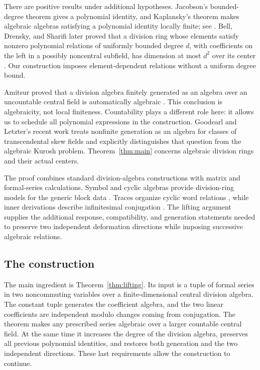 There are positive results under additional hypotheses. Jacobson's
bounded-degree theorem gives a polynomial identity, and Kaplansky's
theorem makes algebraic algebras satisfying a polynomial identity
locally finite; see \cite[Theorems~3 and~5]{Jacobson1952}.
Bell, Drensky, and Sharifi later proved that a division ring whose
elements satisfy nonzero polynomial relations of uniformly bounded degree $d$,
with coefficients on the left in a possibly noncentral subfield, has
dimension at most $d^2$ over its center
\cite[Theorem~1.3]{BellDrenskySharifi2013}. Our construction imposes
element-dependent relations without a uniform degree bound.

Amitsur proved that a division algebra finitely generated as an algebra
over an uncountable central field is automatically algebraic
\cite[Corollary~$2'$]{Amitsur1956}. This conclusion is algebraicity,
not local finiteness. Countability plays a different role here: it
allows us to schedule all polynomial expressions in the construction.
Goodearl and Letzter's recent work \cite{GoodearlLetzter2026} treats
nonfinite generation as an algebra for classes of transcendental skew
fields and explicitly distinguishes that question from the algebraic
Kurosh problem. Theorem~\ref{thm:main} concerns algebraic division rings
and their actual centers.

The proof combines standard division-algebra constructions with matrix
and formal-series calculations. Symbol and cyclic algebras provide
division-ring models for the generic block data
\cite[Section~2.5]{GilleSzamuely2006}. Traces organize cyclic word
relations \cite[Section~4]{Procesi1976}, while inner derivations describe
infinitesimal conjugation \cite[Theorem~8]{Jacobson1937Derivations}.
The lifting argument supplies the additional response, compatibility,
and generation statements needed to preserve two independent deformation
directions while imposing successive algebraic relations.

\subsection{The construction}

The main ingredient is Theorem~\ref{thm:lifting}. Its input is a tuple of
formal series in two noncommuting variables over a finite-dimensional
central division algebra. The constant tuple generates the coefficient
algebra, and the two linear coefficients are independent modulo changes
coming from conjugation. The theorem makes any prescribed series
algebraic over a larger countable central field. At the same time it
increases the degree of the division algebra, preserves all previous
polynomial identities, and restores both generation and the two independent
directions. These last requirements allow the construction to continue.

